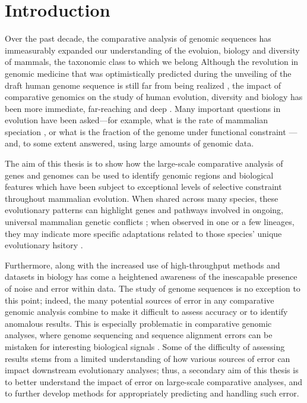 \chapter{Introduction}\label{ch_intro}

Over the past decade, the comparative analysis of genomic sequences
has immeasurably expanded our understanding of the evoluion, biology
and diversity of mammals, the taxonomic class to which we belong
Although the revolution in genomic
medicine that was optimistically predicted during the unveiling of the
draft human genome sequence is still far from being realized
\citep{Collins2001,Varmus2010}, the impact of comparative genomics on
the study of human evolution, diversity and biology has been more
immediate, far-reaching and deep \citep{OBrien1999,Lander2011}. Many
important questions in evolution have been asked---for example, what
is the rate of mammalian speciation
\citep{BinindaEmonds2007,Venditti2011}, or what is the fraction of the
genome under functional constraint
\citep{Boffelli2003a,Siepel2005,Ponting2011}---and, to some extent
answered, using large amounts of genomic data.

The aim of this thesis is to show how the large-scale comparative
analysis of genes and genomes can be used to identify genomic regions
and biological features which have been subject to exceptional levels
of selective constraint throughout mammalian evolution. When shared
across many species, these evolutionary patterns can highlight genes
and pathways involved in ongoing, universal mammalian genetic
conflicts \citep{CastilloDavis2004}; when observed in one or a few
lineages, they may indicate more specific adaptations related to those
species' unique evolutionary hsitory \citep{Sawyer2005a,Nielsen2007}.

Furthermore, along with the increased use of high-throughput methods
and datasets in biology has come a heightened awareness of the
inescapable presence of noise and error within data. The study of
genome sequences is no exception to this point; indeed, the many
potential sources of error in any comparative genomic analysis combine
to make it difficult to assess accuracy or to identify anomalous
results. This is especially problematic in comparative genomic
analyses, where genome sequencing and sequence alignment errors can be
mistaken for interesting biological signals
\citep{Mallick2009,Schneider2009,Fletcher2010,MarkovaRaina2011}. Some
of the difficulty of assessing results stems from a limited
understanding of how various sources of error can impact downstream
evolutionary analyses; thus, a secondary aim of this thesis is to
better understand the impact of error on large-scale comparative
analyses, and to further develop methods for appropriately predicting
and handling such error.


